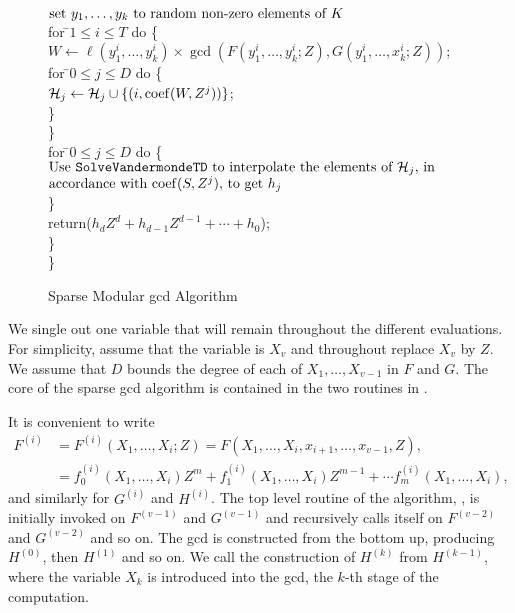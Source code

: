 \begin{figure}
\>\> $\mbox{\rm set $y_1, \ldots, y_k$ to random non-zero elements of $K$}$ \\
\>\> for \=$1 \le i \le T$ do \{ \\
\>\>\> $W \leftarrow \ell(y_1^i, \ldots, y_k^i) \times \gcd(F(y_1^i, \ldots, y_k^i; Z), G(y_1^i, \ldots, x_k^i; Z))$;\\
\>\>\> for \=$0 \le j \le D$ do \{ \\
\>\>\>\> ${\cal H}_j \leftarrow {\cal H}_j \cup \{(i, \operatorname{coef}(W, Z^j)) \}$;
\\
\>\>\>\> \} \\
\>\>\> \} \\
\>\>\> for \=$0 \le j \le D$ do \{ \\
\>\>\> $\mbox{\rm Use {\tt SolveVandermondeTD} to interpolate the elements of
${\cal H}_j$, in}$\\
\>\>\> $\mbox{\rm accordance with $\operatorname{coef}(S, Z^j)$, to get $h_j$}$\\
\>\>\> \} \\
\>\> return($h_d Z^d + h_{d-1} Z^{d-1} + \cdots + h_0$); \\
\>\> \} \\
\> \}
\enddsacode

\caption{Sparse Modular {\sc gcd} Algorithm \label{SparseGCD:Fig}}
\end{figure}

We single out one variable that will remain throughout the different
evaluations.  For simplicity, assume that the variable is $X_v$ and
throughout replace $X_v$ by $Z$.  We assume that $D$ bounds the degree
of each of $X_1, \ldots, X_{v-1}$ in $F$ and $G$.  The core of the
sparse {\sc gcd} algorithm is contained in the two routines in
.

It is convenient to write
\[
\begin{aligned}
F^{(i)} &= F^{(i)}(X_1, \ldots, X_i; Z) = 
F(X_1, \ldots, X_i, x_{i+1}, \ldots, x_{v-1}, Z), \\
& = f^{(i)}_0(X_1, \ldots, X_i) Z^m + f^{(i)}_1(X_1, \ldots, X_i) Z^{m-1} 
 + \cdots f^{(i)}_m(X_1, \ldots, X_i),
\end{aligned}
\]
and similarly for $G^{(i)}$ and $H^{(i)}$.  The top level routine of
the algorithm, , is initially invoked on $F^{(v-1)}$
and $G^{(v-1)}$ and recursively calls itself on $F^{(v-2)}$ and
$G^{(v-2)}$ and so on.  The {\sc gcd} is constructed from the bottom
up, producing $H^{(0)}$, then $H^{(1)}$ and so on.  We call the
construction of $H^{(k)}$ from $H^{(k-1)}$, where the variable $X_k$
is introduced into the {\sc gcd}, the $k$-th stage of the
computation.


